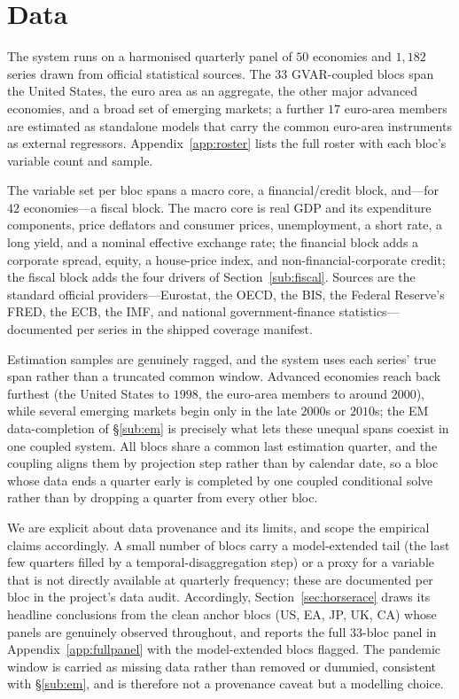 \documentclass[11pt]{article}
\begin{document}
\section{Data}
\label{sec:data}

The system runs on a harmonised quarterly panel of $50$ economies and $1{,}182$ series drawn from
official statistical sources. The $33$ GVAR-coupled blocs span the United States, the euro area as an
aggregate, the other major advanced economies, and a broad set of emerging markets; a further $17$
euro-area members are estimated as standalone models that carry the common euro-area instruments as
external regressors. Appendix~\ref{app:roster} lists the full roster with each bloc's variable count and
sample.

The variable set per bloc spans a macro core, a financial/credit block, and---for $42$ economies---a
fiscal block. The macro core is real GDP and its expenditure components, price deflators and consumer
prices, unemployment, a short rate, a long yield, and a nominal effective exchange rate; the financial
block adds a corporate spread, equity, a house-price index, and non-financial-corporate credit; the
fiscal block adds the four drivers of Section~\ref{sub:fiscal}. Sources are the standard official
providers---Eurostat, the OECD, the BIS, the Federal Reserve's FRED, the ECB, the IMF, and national
government-finance statistics---documented per series in the shipped coverage manifest.

Estimation samples are genuinely ragged, and the system uses each series' true span rather than a
truncated common window. Advanced economies reach back furthest (the United States to $1998$, the
euro-area members to around $2000$), while several emerging markets begin only in the late $2000$s or
$2010$s; the EM data-completion of \S\ref{sub:em} is precisely what lets these unequal spans coexist in
one coupled system. All blocs share a common last estimation quarter, and the coupling aligns them by
projection step rather than by calendar date, so a bloc whose data ends a quarter early is completed by
one coupled conditional solve rather than by dropping a quarter from every other bloc.

We are explicit about data provenance and its limits, and scope the empirical claims accordingly. A small
number of blocs carry a model-extended tail (the last few quarters filled by a temporal-disaggregation
step) or a proxy for a variable that is not directly available at quarterly frequency; these are
documented per bloc in the project's data audit. Accordingly, Section~\ref{sec:horserace} draws its
headline conclusions from the clean anchor blocs (US, EA, JP, UK, CA) whose panels are genuinely observed
throughout, and reports the full $33$-bloc panel in Appendix~\ref{app:fullpanel} with the model-extended
blocs flagged. The pandemic window is carried as missing data rather than removed or dummied, consistent
with \S\ref{sub:em}, and is therefore not a provenance caveat but a modelling choice.
\end{document}
